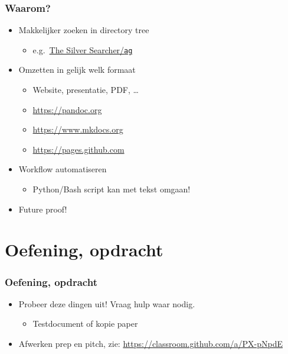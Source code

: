 \documentclass[aspectratio=169]{beamer}
\begin{document}
\begin{frame}
  \frametitle{Waarom?}

  \begin{itemize}
    \item Makkelijker zoeken in directory tree
          \begin{itemize}
            \item e.g.~\href{https://github.com/ggreer/the_silver_searcher}{The Silver Searcher/\texttt{ag}}
          \end{itemize}
    \item Omzetten in gelijk welk formaat
          \begin{itemize}
            \item Website, presentatie, PDF, \ldots
            \item \url{https://pandoc.org}
            \item \url{https://www.mkdocs.org}
            \item \url{https://pages.github.com}
          \end{itemize}
    \item Workflow automatiseren
          \begin{itemize}
            \item Python/Bash script kan met tekst omgaan!
          \end{itemize}
    \item Future proof!
  \end{itemize}

\end{frame}

\section{Oefening, opdracht}

\begin{frame}
  \frametitle{Oefening, opdracht}

  \begin{itemize}
    \item Probeer deze dingen uit! Vraag hulp waar nodig.
          \begin{itemize}
            \item Testdocument of kopie paper
          \end{itemize}
    \item Afwerken prep en pitch, zie: 
    \url{https://classroom.github.com/a/PX-pNpdE}
  \end{itemize}
\end{frame}
\end{document}
